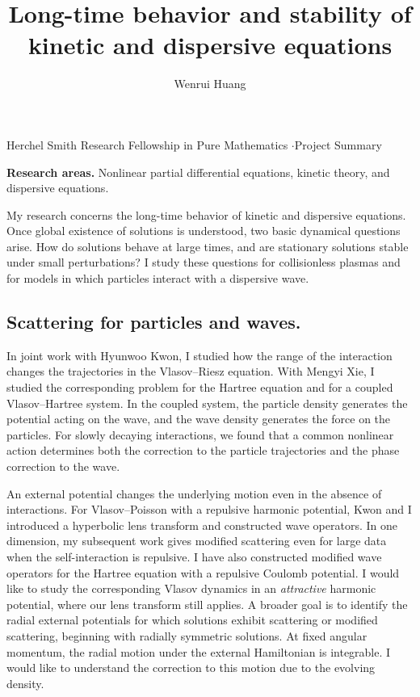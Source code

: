 \documentclass[reqno,10pt,a4paper]{amsart}
\title[Long-time behavior and stability]{Long-time behavior and stability of\\ kinetic and dispersive equations}
\author{Wenrui Huang}
\date{}
\numberwithin{equation}{section}
\begin{document}
\maketitle
\begin{center}
{\small Herchel Smith Research Fellowship in Pure Mathematics \enspace$\cdot$\enspace Project Summary}
\end{center}
\smallskip
\noindent\textbf{Research areas.} Nonlinear partial differential equations, kinetic theory, and dispersive equations.
\medskip

My research concerns the long-time behavior of kinetic and dispersive equations. Once global existence of solutions is understood, two basic dynamical questions arise. How do solutions behave at large times, and are stationary solutions stable under small perturbations? I study these questions for collisionless plasmas and for models in which particles interact with a dispersive wave.

\subsection*{Scattering for particles and waves.}
In joint work with Hyunwoo Kwon, I studied how the range of the interaction changes the trajectories in the Vlasov--Riesz equation. With Mengyi Xie, I studied the corresponding problem for the Hartree equation and for a coupled Vlasov--Hartree system. In the coupled system, the particle density generates the potential acting on the wave, and the wave density generates the force on the particles. For slowly decaying interactions, we found that a common nonlinear action determines both the correction to the particle trajectories and the phase correction to the wave.

An external potential changes the underlying motion even in the absence of interactions. For Vlasov--Poisson with a repulsive harmonic potential, Kwon and I introduced a hyperbolic lens transform and constructed wave operators. In one dimension, my subsequent work gives modified scattering even for large data when the self-interaction is repulsive. I have also constructed modified wave operators for the Hartree equation with a repulsive Coulomb potential. I would like to study the corresponding Vlasov dynamics in an \emph{attractive} harmonic potential, where our lens transform still applies. A broader goal is to identify the radial external potentials for which solutions exhibit scattering or modified scattering, beginning with radially symmetric solutions. At fixed angular momentum, the radial motion under the external Hamiltonian is integrable. I would like to understand the correction to this motion due to the evolving density.
\end{document}
